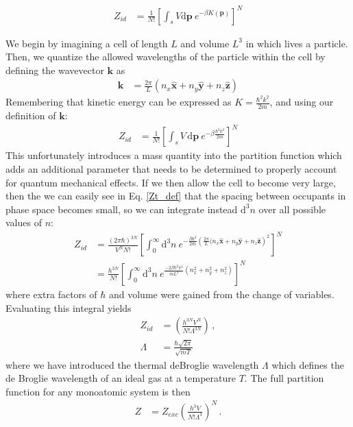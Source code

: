 \documentclass[12pt]{article}
\newcommand*{\diff}{\mathrm{d}}
\begin{document}
\begin{align}
    Z_{id} &= \frac{1}{N!}\left[\int_s V \diff\mathbf{p} ~e^{-\beta K(\mathbf{p})}\right]^{N}
\end{align}

We begin by imagining a cell of length $L$ and volume $L^3$ in which lives a particle. Then, we quantize the allowed wavelengths of the particle within the cell by defining the wavevector $\mathbf{k}$ as
\begin{align}
    \mathbf{k} &= \frac{2\pi}{L}(n_x\mathbf{\hat{x}} + n_y\mathbf{\hat{y}} + n_z\mathbf{\hat{z}})
\end{align}
Remembering that kinetic energy can be expressed as $K = \frac{\hbar^2 k^2}{2m}$, and using our definition of $\mathbf{k}$:
\begin{align}
    Z_{id} &= \frac{1}{N!}\left[\int_s V\, \diff\mathbf{p} ~e^{-\beta \frac{\hbar^2 k^2}{2m}}\right]^{N}
    \label{Zt_def}
\end{align}
This unfortunately introduces a mass quantity into the partition function which adds an additional parameter that needs to be determined to properly account for quantum mechanical effects. If we then allow the cell to become very large, then the we can easily see in Eq. \ref{Zt_def} that the spacing between occupants in phase space becomes small, so we can integrate instead $\diff ^3 n$ over all possible values of $n$:
\begin{align}
    Z_{id} &= \frac{(2\pi \hbar)^{3N}}{V^N N!}\left[\int_0^\infty \diff^3 n ~e^{-\frac{\beta \hbar^2}{2m} \left(\frac{2\pi}{L}(n_x\mathbf{\hat{x}} + n_y\mathbf{\hat{y}} + n_z\mathbf{\hat{z}}\right)^2}\right]^{N} \\
    &= \frac{h^{3N}}{N!}\left[\int_0^\infty \diff^3 n ~e^{ \frac{-2\beta \hbar^2\pi^2}{mL^2}(n_x^2 + n_y^2 + n_z^2)}\right]^{N}
\end{align}
where extra factors of $\hbar $ and volume were gained from the change of variables. Evaluating this integral yields
\begin{align}
    Z_{id} &= \left(\frac{h^{3N} V^N}{N!\Lambda^{3N}}\right) \,, \\
    \Lambda &= \frac{\hbar\sqrt{2\pi}}{\sqrt{mT}}
\end{align}
where we have introduced the thermal deBroglie wavelength $\Lambda$ which defines the de Broglie wavelength of an ideal gas at a temperature $T$. The full partition function for any monoatomic system is then
\begin{align}
    Z &= Z_{exc} \left(\frac{h^3 V}{N!\Lambda^{3}}\right)^{N} \,.
\end{align}
\end{document}
